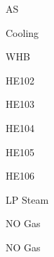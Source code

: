 \documentclass[a4paper,portrait,12pt]{article}
\begin{document}
\begin{flushleft}
AS
\end{flushleft}





\begin{flushleft}
Cooling
\end{flushleft}





\begin{flushleft}
WHB
\end{flushleft}





\begin{flushleft}
HE102
\end{flushleft}





\begin{flushleft}
HE103
\end{flushleft}





\begin{flushleft}
HE104
\end{flushleft}





\begin{flushleft}
HE105
\end{flushleft}





\begin{flushleft}
HE106
\end{flushleft}





\begin{flushleft}
LP Steam
\end{flushleft}





\begin{flushleft}
NO Gas
\end{flushleft}





\begin{flushleft}
NO Gas
\end{flushleft}
\end{document}

